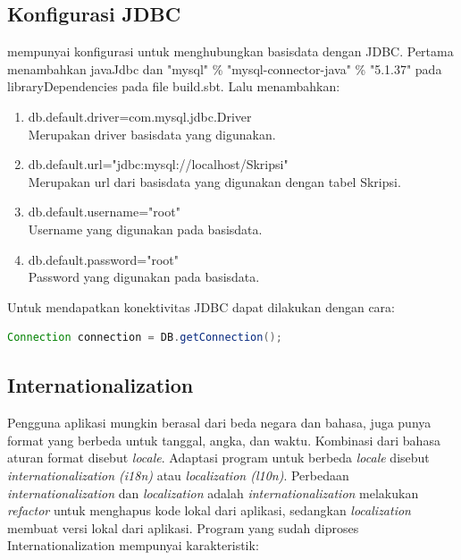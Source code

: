\subsection{Konfigurasi JDBC}
\play mempunyai konfigurasi untuk menghubungkan basisdata dengan JDBC. Pertama menambahkan javaJdbc dan "mysql" \% "mysql-connector-java" \% "5.1.37" pada libraryDependencies pada file build.sbt. Lalu menambahkan:
\begin{enumerate}
	\item db.default.driver=com.mysql.jdbc.Driver\\
			Merupakan driver basisdata yang digunakan.
	\item db.default.url="jdbc:mysql://localhost/Skripsi"\\
			Merupakan url dari basisdata yang digunakan dengan tabel Skripsi.
	\item db.default.username="root"\\
			Username yang digunakan pada basisdata.
	\item db.default.password="root"\\
			Password yang digunakan pada basisdata.
\end{enumerate}

Untuk mendapatkan konektivitas JDBC dapat dilakukan dengan cara:

\begin{lstlisting}[caption=Contoh mendapatkan konektivitas JDBC,label = {lst_2_konek_jdbc},language=Java]
	Connection connection = DB.getConnection();
\end{lstlisting} 

\subsection{Internationalization}
Pengguna aplikasi mungkin berasal dari beda negara dan bahasa, juga punya format yang berbeda untuk tanggal, angka, dan waktu. Kombinasi dari bahasa aturan format disebut \textit{locale}. Adaptasi program untuk berbeda \textit{locale} disebut \textit{internationalization (i18n)} atau \textit{localization (l10n)}. Perbedaan \textit{internationalization} dan \textit{localization} adalah \textit{internationalization} melakukan \textit{refactor} untuk menghapus kode lokal dari aplikasi, sedangkan \textit{localization} membuat versi lokal dari aplikasi. Program yang sudah diproses Internationalization mempunyai karakteristik:

